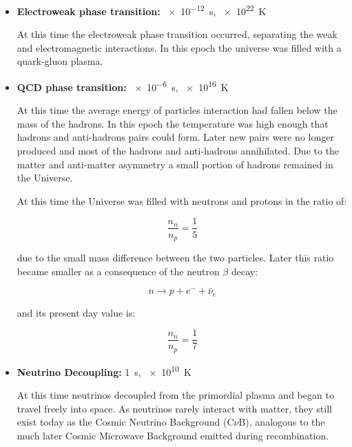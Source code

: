 \begin{itemize}
        \item \textbf{Electroweak phase transition:} \SI{e-12}{\second},
        \SI{e22}{\kelvin}

        At this time the electroweak phase transition occurred, separating
        the weak and electromagnetic interactions. In this epoch the
        universe was filled with a quark-gluon plasma.
        \item \textbf{QCD phase transition:} \SI{e-6}{\second},
        \SI{e16}{\kelvin}

        At this time the average energy of particles interaction had fallen
        below the mass of the hadrons. In this epoch the temperature was
        high enough that hadrons and anti-hadrons pairs could form. Later
        new pairs were no longer produced and most of the hadrons and
        anti-hadrons annihilated. Due to the matter and anti-matter
        asymmetry a small portion of hadrons remained in the Universe.

        At this time the Universe was filled with neutrons and protons in
        the ratio of:

        \begin{equation}
                \frac{n_n}{n_p} = \frac{1}{5}
        \end{equation}

        due to the small mass difference between the two particles. Later
        this ratio became smaller as a consequence of the neutron $\beta$
        decay:

        \begin{equation}
                n \rightarrow p + e^- + \bar\nu_e
        \end{equation}

        and its present day value is:

        \begin{equation}
                \frac{n_n}{n_p} = \frac{1}{7}
        \end{equation}

        \item \textbf{Neutrino Decoupling:} \SI{1}{\second},
        \SI{e10}{\kelvin}

        At this time neutrinos decoupled from the primordial plasma and
        began to travel freely into space. As neutrinos rarely interact
        with matter, they still exist today as the Cosmic
        Neutrino Background (C$\nu$B), analogous to the much later Cosmic
        Microwave Background emitted during recombination.


\end{itemize}
